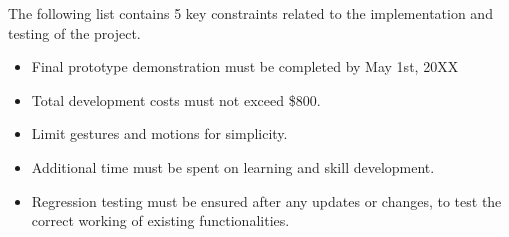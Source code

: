 The following list contains 5 key constraints related to the implementation and testing of the project.

\begin{itemize}
  \item Final prototype demonstration must be completed by May 1st, 20XX
  \item Total development costs must not exceed \$800.
  \item Limit gestures and motions for simplicity.
  \item Additional time must be spent on learning and skill development.
  \item Regression testing must be ensured after any updates or changes, to test the correct working of existing functionalities.
\end{itemize}
